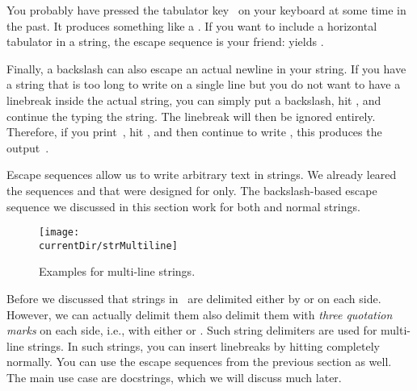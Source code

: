 You probably have pressed the tabulator key~\keys{\tab} on your keyboard at some time in the past.
It produces something like a .
If you want to include a horizontal tabulator in a string, the escape sequence  is your friend:
 yields .

Finally, a backslash can also escape an actual newline in your string.
If you have a string that is too long to write on a single line but you do not want to have a linebreak inside the actual string, you can simply put a backslash, hit \keys{\enter}, and continue the typing the string.
The linebreak will then be ignored entirely.
Therefore, if you print~, hit \keys{\enter}, and then continue to write , this produces the output~.

Escape sequences allow us to write arbitrary text in strings.
We already leared the sequences \inQuotes{\textbraceleft\textbraceleft}\pythonIdx{\textbraceleft\textbraceleft} and \inQuotes{\textbraceright\textbraceright}\pythonIdx{\textbraceright\textbraceright} that were designed for  only.
The backslash-based escape sequence we discussed in this section work for both  and normal strings.%
\endhsection%
%
%
%
\begin{figure}%
\centering%
\texttt{[image: \\currentDir/strMultiline]}%
\caption{Examples for multi-line strings.}%
\label{fig:strMultiline}%
\end{figure}%
%
Before we discussed that strings in \python\ are delimited either by \pythonIdx{\textquotedbl} or \pythonIdx{\textquotesingle} on each side.
However, we can actually delimit them also delimit them with \emph{three quotation marks} on each side, i.e., with either \pythonIdx{\textquotedbl\textquotedbl\textquotedbl} or \pythonIdx{\textquotesingle\textquotesingle\textquotesingle}.
Such string delimiters are used for multi-line strings.
In such strings, you can insert linebreaks by hitting \keys{\enter} completely normally.
You can use the escape sequences from the previous section as well.
The main use case are docstrings, which we will discuss much later.

